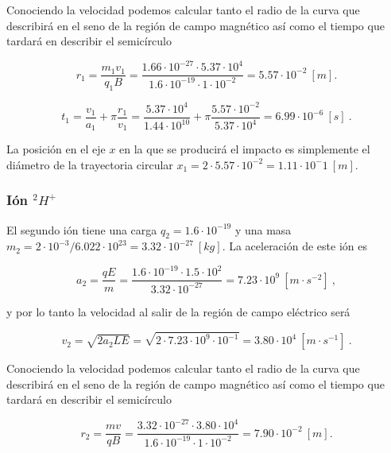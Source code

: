 \documentclass[journal]{IEEEtran}
\begin{document}
Conociendo la velocidad podemos calcular tanto el radio de la curva que describirá en el seno de la región de campo magnético así como el tiempo que tardará en describir el semicírculo

\begin{equation}
r_1 = \displaystyle\frac{m_1v_1}{q_1B} = \displaystyle\frac{1.66\cdot 10^{-27} \cdot 5.37\cdot 10^4}{1.6\cdot 10^{-19}\cdot 1 \cdot 10^{-2}} = 5.57 \cdot 10^{-2}~[m].
\end{equation}

\begin{equation}
t_1 = \displaystyle\frac{v_1}{a_1} + \pi \displaystyle\frac{r_1}{v_1} = \displaystyle\frac{5.37 \cdot 10^4}{1.44 \cdot 10^{10}} + \pi \displaystyle\frac{5.57 \cdot 10^{-2}}{5.37 \cdot 10^4} = 6.99 \cdot 10^{-6}~[s]~.
\end{equation}

La posición en el eje $x$ en la que se producirá el impacto es simplemente el diámetro de la trayectoria circular $x_1 = 2\cdot5.57 \cdot 10^{-2} = 1.11 \cdot 10^-1~[m]$.

\subsubsection{Ión $^2H^+$}

El segundo ión tiene una carga $q_2 = 1.6\cdot 10^{-19}$ y una masa $m_2 = 2\cdot 10^{-3} / 6.022\cdot 10^{23} = 3.32\cdot 10^{-27}~[kg]$. La aceleración de este ión es

\begin{equation}
a_2 = \displaystyle\frac{qE}{m} = \displaystyle\frac{1.6\cdot 10^{-19}\cdot 1.5\cdot 10^{2}}{3.32\cdot 10^{-27}} = 7.23 \cdot 10^{9}~[m\cdot s^{-2}]~,
\end{equation}

y por lo tanto la velocidad al salir de la región de campo eléctrico será

\begin{equation}
v_2 = \sqrt{2a_2LE} = \sqrt{2\cdot 7.23 \cdot 10^{9} \cdot 10^{-1}} = 3.80 \cdot 10^4~[m\cdot s^{-1}]~.
\end{equation}

Conociendo la velocidad podemos calcular tanto el radio de la curva que describirá en el seno de la región de campo magnético así como el tiempo que tardará en describir el semicírculo

\begin{equation}
r_2 = \displaystyle\frac{mv}{qB} = \displaystyle\frac{3.32\cdot 10^{-27} \cdot 3.80\cdot 10^4}{1.6\cdot 10^{-19}\cdot 1 \cdot 10^{-2}} = 7.90\cdot 10^{-2}~[m].
\end{equation}
\end{document}
